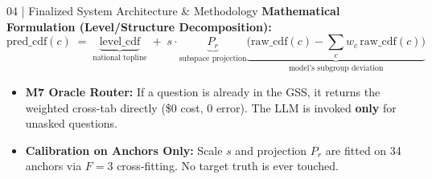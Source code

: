 \documentclass[10pt,aspectratio=169]{beamer}
\begin{document}
\begin{frame}{04 | Finalized System Architecture \& Methodology}
    \vspace{0.15cm}
    \scriptsize
    \textbf{Mathematical Formulation (Level/Structure Decomposition):}
    \[
        \text{pred\_cdf}(c) \;=\; \underbrace{\text{level\_cdf}}_{\text{national topline}} \;+\; s \cdot \underbrace{P_r}_{\text{subspace projection}} \underbrace{\Big(\text{raw\_cdf}(c) - {\textstyle\sum_c} w_c\, \text{raw\_cdf}(c)\Big)}_{\text{model's subgroup deviation}}
    \]
    \begin{itemize}\itemsep2pt
        \item \textbf{M7 Oracle Router:} If a question is already in the GSS, it returns the weighted cross-tab directly (\$0 cost, 0 error). The LLM is invoked \textbf{only} for unasked questions.
        \item \textbf{Calibration on Anchors Only:} Scale $s$ and projection $P_r$ are fitted on 34 anchors via $F=3$ cross-fitting. No target truth is ever touched.
    \end{itemize}
\end{frame}
\end{document}
